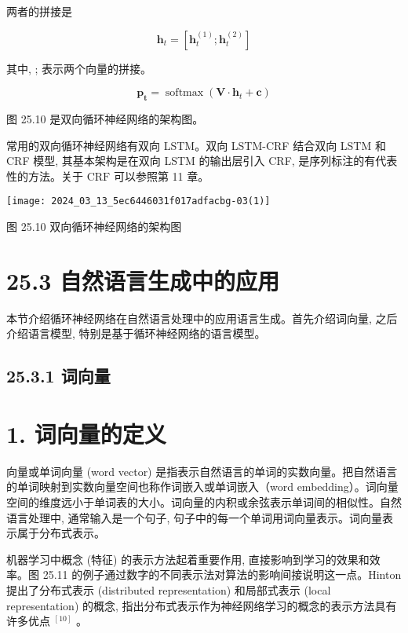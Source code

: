 \documentclass[10pt]{article}
\begin{document}
两者的拼接是


\begin{equation*}
\boldsymbol{h}_{t}=\left[\boldsymbol{h}_{t}^{(1)} ; \boldsymbol{h}_{t}^{(2)}\right] \tag{25.37}
\end{equation*}


其中, ; 表示两个向量的拼接。


\begin{equation*}
\boldsymbol{p}_{\boldsymbol{t}}=\operatorname{softmax}\left(\boldsymbol{V} \cdot \boldsymbol{h}_{t}+\boldsymbol{c}\right) \tag{25.38}
\end{equation*}


图 25.10 是双向循环神经网络的架构图。

常用的双向循环神经网络有双向 LSTM。双向 LSTM-CRF 结合双向 LSTM 和 CRF 模型, 其基本架构是在双向 LSTM 的输出层引入 CRF, 是序列标注的有代表性的方法。关于 $\mathrm{CRF}$ 可以参照第 11 章。

\begin{center}
\texttt{[image: 2024\_03\_13\_5ec6446031f017adfacbg-03(1)]}
\end{center}

图 25.10 双向循环神经网络的架构图

\section*{25.3 自然语言生成中的应用}
本节介绍循环神经网络在自然语言处理中的应用语言生成。首先介绍词向量, 之后介绍语言模型, 特别是基于循环神经网络的语言模型。

\subsection*{25.3.1 词向量}
\section*{1. 词向量的定义}
向量或单词向量 (word vector) 是指表示自然语言的单词的实数向量。把自然语言的单词映射到实数向量空间也称作词嵌入或单词嵌入（word embedding）。词向量空间的维度远小于单词表的大小。词向量的内积或余弦表示单词间的相似性。自然语言处理中, 通常输入是一个句子, 句子中的每一个单词用词向量表示。词向量表示属于分布式表示。

机器学习中概念 (特征) 的表示方法起着重要作用, 直接影响到学习的效果和效率。图 25.11 的例子通过数字的不同表示法对算法的影响间接说明这一点。Hinton 提出了分布式表示 (distributed representation) 和局部式表示 (local representation) 的概念, 指出分布式表示作为神经网络学习的概念的表示方法具有许多优点 ${ }^{[10]}$ 。
\end{document}
